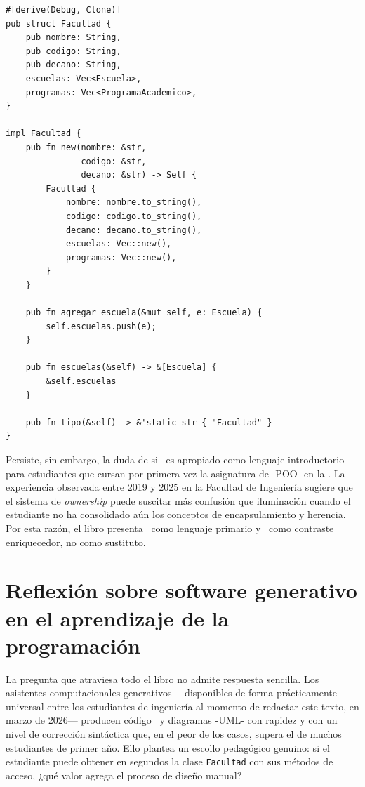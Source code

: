 \begin{lstlisting}[style=rustStyle,
  caption={\textit{Struct} \texttt{Facultad} en \rust\ con
    implementación de métodos.},
  label={lst:rust-facultad}]
#[derive(Debug, Clone)]
pub struct Facultad {
    pub nombre: String,
    pub codigo: String,
    pub decano: String,
    escuelas: Vec<Escuela>,
    programas: Vec<ProgramaAcademico>,
}

impl Facultad {
    pub fn new(nombre: &str,
               codigo: &str,
               decano: &str) -> Self {
        Facultad {
            nombre: nombre.to_string(),
            codigo: codigo.to_string(),
            decano: decano.to_string(),
            escuelas: Vec::new(),
            programas: Vec::new(),
        }
    }

    pub fn agregar_escuela(&mut self, e: Escuela) {
        self.escuelas.push(e);
    }

    pub fn escuelas(&self) -> &[Escuela] {
        &self.escuelas
    }

    pub fn tipo(&self) -> &'static str { "Facultad" }
}
\end{lstlisting}

Persiste, sin embargo, la duda de si \rust\ es apropiado como lenguaje
introductorio para estudiantes que cursan por primera vez la asignatura
de -POO- en la \ud. La experiencia observada entre 2019 y 2025 en la
Facultad de Ingeniería sugiere que el sistema de \textit{ownership} puede
suscitar más confusión que iluminación cuando el estudiante no ha consolidado
aún los conceptos de encapsulamiento y herencia. Por esta razón, el libro
presenta \java\ como lenguaje primario y \rust\ como contraste enriquecedor,
no como sustituto.

\section{Reflexión sobre software generativo en el aprendizaje
  de la programación}
\label{sec:ia-reflexion-intro}

La pregunta que atraviesa todo el libro no admite respuesta sencilla.
Los asistentes computacionales generativos ---disponibles de forma
prácticamente universal entre los estudiantes de ingeniería al momento
de redactar este texto, en marzo de 2026--- producen código \java\ y
diagramas -UML- con rapidez y con un nivel de corrección sintáctica que,
en el peor de los casos, supera el de muchos estudiantes de primer año.
Ello plantea un escollo pedagógico genuino: si el estudiante puede obtener
en segundos la clase \texttt{Facultad} con sus métodos de acceso, ¿qué
valor agrega el proceso de diseño manual?

